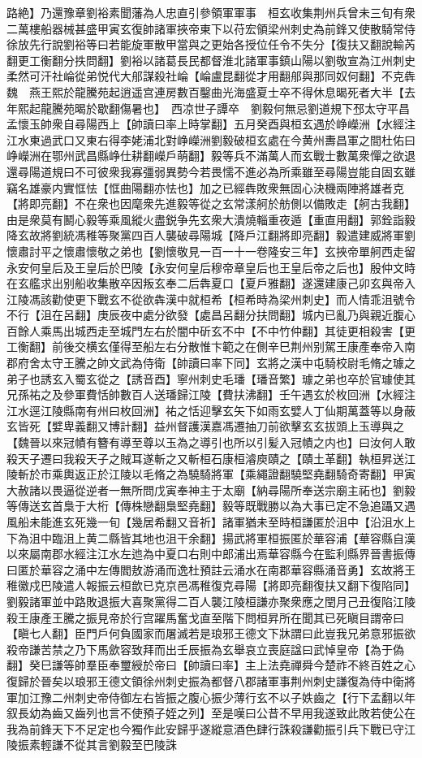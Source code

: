 路絶】乃還豫章劉裕素聞藩為人忠直引參領軍軍事　桓玄收集荆州兵曾未三旬有衆二萬樓船器械甚盛甲寅玄復帥諸軍挾帝東下以苻宏領梁州刺史為前鋒又使散騎常侍徐放先行說劉裕等曰若能旋軍散甲當與之更始各授位任令不失分【復扶又翻說輸芮翻更工衡翻分抶問翻】劉裕以諸葛長民都督淮北諸軍事鎮山陽以劉敬宣為江州刺史　柔然可汗社崘從弟悦代大郍謀殺社崘【崘盧昆翻從才用翻郍與那同奴何翻】不克犇魏　燕王熙於龍騰苑起逍遥宫連房數百鑿曲光海盛夏士卒不得休息暍死者大半【去年熙起龍騰苑暍於歇翻傷暑也】　西凉世子譚卒　劉毅何無忌劉道規下邳太守平昌孟懷玉帥衆自尋陽西上【帥讀曰率上時掌翻】五月癸酉與桓玄遇於峥嶸洲【水經注江水東過武口又東右得李姥浦北對峥嶸洲劉毅破桓玄處在今黄州夀昌軍之間杜佑曰峥嶸洲在鄂州武昌縣峥仕耕翻嶸戶萌翻】毅等兵不滿萬人而玄戰士數萬衆憚之欲退還尋陽道規曰不可彼衆我寡彊弱異勢今若畏懦不進必為所乘雖至尋陽豈能自固玄雖竊名雄豪内實恇怯【恇曲陽翻亦怯也】加之已經犇敗衆無固心決機兩陣將雄者克【將即亮翻】不在衆也因麾衆先進毅等從之玄常漾舸於舫側以備敗走【舸古我翻】由是衆莫有鬭心毅等乘風縱火盡鋭争先玄衆大潰燒輜重夜遁【重直用翻】郭銓詣毅降玄故將劉統馮稚等聚黨四百人襲破尋陽城【降戶江翻將即亮翻】毅遣建威將軍劉懷肅討平之懷肅懷敬之弟也【劉懷敬見一百一十一卷隆安三年】玄挾帝單舸西走留永安何皇后及王皇后於巴陵【永安何皇后穆帝章皇后也王皇后帝之后也】殷仲文時在玄艦求出别船收集散卒因叛玄奉二后犇夏口【夏戶雅翻】遂還建康己卯玄與帝入江陵馮該勸使更下戰玄不從欲犇漢中就桓希【桓希時為梁州刺史】而人情乖沮號令不行【沮在呂翻】庚辰夜中處分欲發【處昌呂翻分扶問翻】城内已亂乃與親近腹心百餘人乘馬出城西走至城門左右於闇中斫玄不中【不中竹仲翻】其徒更相殺害【更工衡翻】前後交横玄僅得至船左右分散惟卞範之在側辛巳荆州别駕王康產奉帝入南郡府舍太守王騰之帥文武為侍衛【帥讀曰率下同】玄將之漢中屯騎校尉毛脩之璩之弟子也誘玄入蜀玄從之【誘音酉】寧州刺史毛璠【璠音繁】璩之弟也卒於官璩使其兄孫祐之及參軍費恬帥數百人送璠歸江陵【費扶沸翻】壬午遇玄於枚回洲【水經注江水逕江陵縣南有州曰枚回洲】祐之恬迎擊玄矢下如雨玄嬖人丁仙期萬蓋等以身蔽玄皆死【嬖卑義翻又博計翻】益州督護漢嘉馮遷抽刀前欲擊玄玄拔頭上玉導與之【魏晉以來冠幘有簪有導至尊以玉為之導引也所以引髪入冠幘之内也】曰汝何人敢殺天子遷曰我殺天子之賊耳遂斬之又斬桓石康桓濬庾賾之【賾土革翻】執桓昇送江陵斬於市乘輿返正於江陵以毛脩之為驍騎將軍【乘繩證翻驍堅堯翻騎奇寄翻】甲寅大赦諸以畏逼從逆者一無所問戊寅奉神主于太廟【納尋陽所奉送宗廟主祏也】劉毅等傳送玄首梟于大桁【傳株戀翻梟堅堯翻】毅等既戰勝以為大事已定不急追躡又遇風船未能進玄死幾一旬【幾居希翻又音祈】諸軍猶未至時桓謙匿於沮中【沿沮水上下為沮中臨沮上黄二縣皆其地也沮干余翻】揚武將軍桓振匿於華容浦【華容縣自漢以來屬南郡水經注江水左迆為中夏口右則中郎浦出焉華容縣今在監利縣界晉書振傳曰匿於華容之涌中左傳閻敖游涌而逸杜預註云涌水在南郡華容縣涌音勇】玄故將王稚徽戍巴陵遣人報振云桓歆已克京邑馮稚復克尋陽【將即亮翻復扶又翻下復陷同】劉毅諸軍並中路敗退振大喜聚黨得二百人襲江陵桓謙亦聚衆應之閏月己丑復陷江陵殺王康產王騰之振見帝於行宫躍馬奮戈直至階下問桓昇所在聞其已死瞋目謂帝曰【瞋七人翻】臣門戶何負國家而屠滅若是琅邪王德文下牀謂曰此豈我兄弟意邪振欲殺帝謙苦禁之乃下馬歛容致拜而出壬辰振為玄舉哀立喪庭諡曰武悼皇帝【為于偽翻】癸巳謙等帥羣臣奉璽綬於帝曰【帥讀曰率】主上法堯禪舜今楚祚不終百姓之心復歸於晉矣以琅邪王德文領徐州刺史振為都督八郡諸軍事荆州刺史謙復為侍中衛將軍加江豫二州刺史帝侍御左右皆振之腹心振少薄行玄不以子妷齒之【行下孟翻以年叙長幼為齒又齒列也言不使預子姪之列】至是嘆曰公昔不早用我遂致此敗若使公在我為前鋒天下不足定也今獨作此安歸乎遂縱意酒色肆行誅殺謙勸振引兵下戰已守江陵振素輕謙不從其言劉毅至巴陵誅